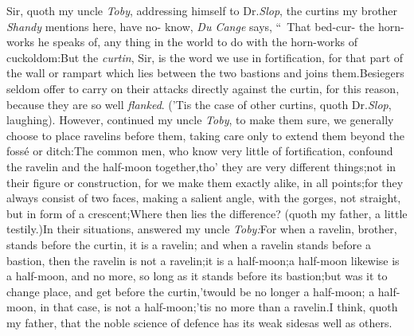 \documentclass{article}
\begin{document}
Sir, quoth my uncle \textit{Toby}, addressing himself to Dr.\@ \textit{Slop},\tsk 
the curtins my brother \textit{Shandy} mentions
here, have no-\break
{} know,
\textit{Du Cange} says, “\, That bed-cur-\pb
{}
the horn-works he speaks of, any thing in the world to do with the
horn-works of cuckoldom:\tsk But the \textit{curtin}, Sir, is the
word we use in fortification, for that part of the wall or rampart
which lies between the two bastions and joins them.\tsh Be\-siegers
seldom offer to carry on their attacks directly against the curtin,
for this reason, because they are so well
\textit{flanked}.\break
(’Tis the case of other curtins, quoth Dr.\@ \textit{Slop}, laughing). 
However, continued my uncle \textit{Toby}, to
make them sure, we generally choose to place ravelins before them,
taking care only to extend them beyond the fossé or
ditch:\tsh The common men, who know very little of
fortification, confound the ravelin and the half-moon
together,\tsk tho’ they are very different
things;\tsk not in their figure or\pb
construction, for we make them exactly alike, in all
points;\tsk for they always consist of two faces,
making a salient angle, with the gorges, not straight, but in form
of a crescent;\tsk Where then lies the difference? (quoth
my father, a little testily.)\tsk In their situations, answered
my uncle \textit{Toby:}\tsk For when a ravelin, brother, stands
before the curtin, it is a ravelin; and when a ravelin
stands before a bastion, then the ravelin is not a
ravelin;\tsk it is a half-moon;\tsk a half-moon likewise is a
half-moon, and no more, so long as it stands before its
bastion;\tsh but was it to change place, and get before
the curtin,\tsk ’twould be no longer a half-moon; a
half-moon, in that case, is not a half-moon;\tsk ’tis no
more than a ravelin.\tsh I think, quoth my father, that
the noble science of defence has its weak sides\tsh as
well as others.
\end{document}

